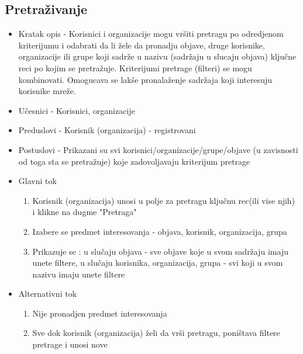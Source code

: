 \subsection{Pretraživanje}
\begin{itemize}
	\item Kratak opis - Korisnici i organizacije mogu vršiti pretragu po odredjenom kriterijumu i odabrati da li žele da pronadju objave, druge korisnike, organizacije ili grupe koji sadrže u nazivu (sadržaju u slucaju objava) ključne reci po kojim se pretražuje. Kriterijumi pretrage (filteri) se mogu kombinovati. Omogucava se lakše pronalaženje sadržaja koji interesuju korisnike mreže.
	\item Učesnici - Korisnici, organizacije
	\item Preduslovi - Korisnik (organizacija) - registrovani
	\item Postuslovi - Prikazani su svi korisnici/organizacije/grupe/objave (u zavisnosti od toga sta se pretražuje) koje zadovoljavaju kriterijum pretrage 
	\item Glavni tok
	\begin{enumerate}
		\item Korisnik (organizacija) unosi u polje za pretragu ključnu rec(ili vise njih) i klikne na dugme "Pretraga"
		\item Izabere se predmet interesovanja - objava, korisnik, organizacija, grupa
		\item Prikazuje se : u slučaju objava - sve objave koje u svom sadržaju imaju unete filtere, u slučaju korisnika, organizacija, grupa - svi koji u svom nazivu imaju unete filtere
	\end{enumerate}
	\item Alternativni tok
	\begin{enumerate}
		\item Nije pronadjen predmet interesovanja
		\item Sve dok korisnik (organizacija) želi da vrši pretragu, poništava filtere pretrage i unosi nove 
	\end{enumerate}
\end{itemize}


